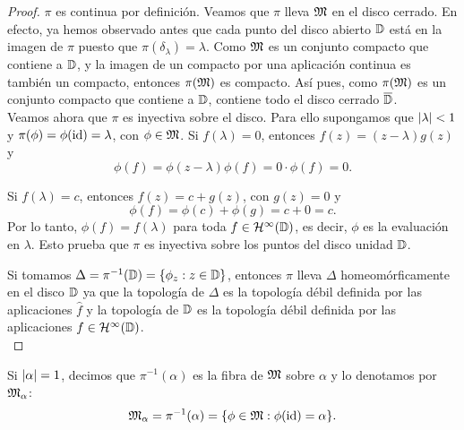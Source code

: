 \begin{proof}
$\pi$ es continua por definición. Veamos que $\pi$ lleva $\mathfrak{M}$ en el disco cerrado. En efecto, ya hemos observado antes que cada punto del disco abierto $\mathbb{D}$ está en la imagen de $\pi$ puesto que $\pi (\delta_\lambda) = \lambda$. Como $\mathfrak{M}$ es un conjunto compacto que contiene a $\mathbb{D}$, y la imagen de un compacto por una aplicación continua es también un compacto, entonces $\pi(\mathfrak{M})$ es compacto. Así pues, como $\pi(\mathfrak{M})$ es un conjunto compacto que contiene a $\mathbb{D}$, contiene todo el disco cerrado $\overline{\mathbb{D}}$. \\

Veamos ahora que $\pi$ es inyectiva sobre el disco. Para ello supongamos que $\left\lvert\lambda\right\rvert < 1$ y $\pi (\phi) = \phi (\operatorname{id}) = \lambda$, con $\phi \in \mathfrak{M}$. Si $f(\lambda) = 0$, entonces $f(z) = (z - \lambda) g(z)$ y
\begin{equation*}
    \phi(f) = \phi(z - \lambda) \phi(f) = 0 \cdot \phi(f) = 0.
\end{equation*}

Si $f(\lambda) = c$, entonces $f(z) = c + g(z)$, con $g(z) = 0$ y
\begin{equation*}
    \phi(f) = \phi(c) + \phi(g) = c + 0 = c.
\end{equation*}
Por lo tanto, $\phi(f) = f(\lambda)$ para toda $f \in \mathcal{H}^{\infty}(\mathbb{D})$, es decir, $\phi$ es la evaluación en $\lambda$. Esto prueba que $\pi$ es inyectiva sobre los puntos del disco unidad $\mathbb{D}$. \\


Si tomamos $\Delta = \pi^{-1} (\mathbb{D}) = \{\phi_z : z \in \mathbb{D}\}$, entonces $\pi$ lleva $\Delta$ homeomórficamente en el disco $\mathbb{D}$ ya que la topología de $\Delta$ es la topología débil definida por las aplicaciones $\widehat f$ y la topología de $\mathbb{D}$ es la topología débil definida por las aplicaciones $f \in \mathcal{H}^{\infty}(\mathbb{D})$. \\
\end{proof}


Si $\left\lvert\alpha\right\rvert = 1$, decimos que $\pi^{-1} (\alpha)$ es la fibra de $\mathfrak{M}$ sobre $\alpha$ y lo denotamos por $\mathfrak{M}_\alpha$:
\begin{equation*}
    \mathfrak{M}_\alpha = \pi^{-1} (\alpha) = \{\phi \in \mathfrak{M} : \phi (\operatorname{id}) = \alpha\}.
\end{equation*}

